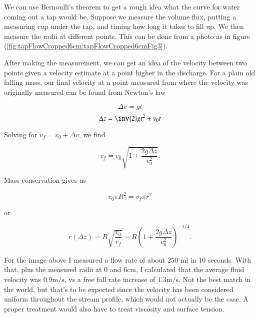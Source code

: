 \begin{Exercise}[
title={Curve for tap discharge},
label={problem:fluids:review:q2}
]
\end{Exercise}

\begin{Answer}[ref={problem:fluids:review:q2}]
We can use Bernoulli's theorem to get a rough idea what the curve for water coming out a tap would be.  Suppose we measure the volume flux, putting a measuring cup under the tap, and timing how long it takes to fill up.  We then measure the radii at different points.  This can be done from a photo as in figure (\ref{fig:tapFlowCropped6cm:tapFlowCropped6cmFig3}).


After making the measurement, we can get an idea of the velocity between two points given a velocity estimate at a point higher in the discharge.  For a plain old falling mass, our final velocity at a point measured from where the velocity was originally measured can be found from Newton's law

\begin{equation}\label{eqn:continuumFluidsReview:1910}
\Delta v = g t
\end{equation}
\begin{equation}\label{eqn:continuumFluidsReview:1930}
\Delta z = \inv{2} g t^2 + v_0 t
\end{equation}

Solving for $v_f = v_0 + \Delta v$, we find

\begin{equation}\label{eqn:continuumFluidsReview:1950}
v_f = v_0 \sqrt{ 1 + \frac{2 g \Delta z}{v_0^2} }.
\end{equation}

Mass conservation gives us

\begin{equation}\label{eqn:continuumFluidsReview:1970}
v_0 \pi R^2 = v_f \pi r^2
\end{equation}

or

\begin{equation}\label{eqn:continuumFluidsReview:1990}
r(\Delta z) = R \sqrt{ \frac{v_0}{v_f} } = R \left( 1 + \frac{2 g \Delta z}{v_0^2} \right)^{-1/4}.
\end{equation}

For the image above I measured a flow rate of about 250 ml in 10 seconds.  With that, plus the measured radii at 0 and $6 \text{cm}$, I calculated that the average fluid velocity was $0.9 \text{m}/\text{s}$, vs a free fall rate increase of $1.3 \text{m}/\text{s}$.  Not the best match in the world, but that's to be expected since the velocity has been considered uniform throughout the stream profile, which would not actually be the case.  A proper treatment would also have to treat viscosity and surface tension.


\end{Answer}
